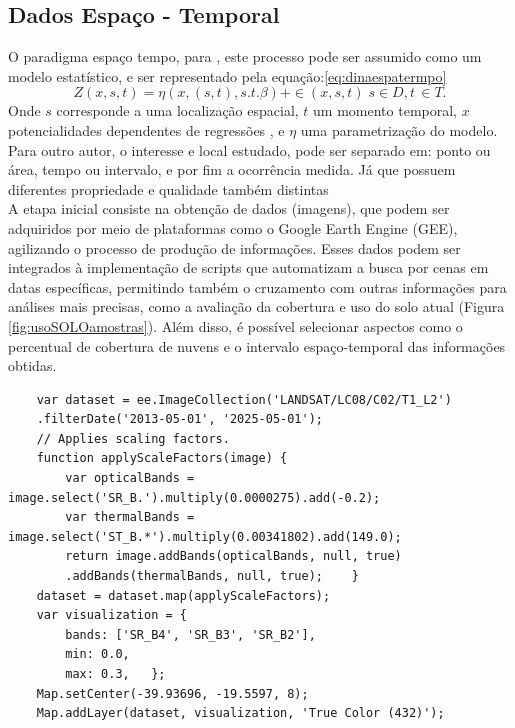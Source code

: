   \subsection{Dados Espaço - Temporal} 
  
  \hspace*{1.25 cm} O paradigma espaço tempo, para \cite[p.2]{mateu}, este processo pode ser assumido como um modelo estatístico, e ser representado pela equação:\eqref{eq:dinaespatermpo}
  \begin{equation}\label{eq:dinaespatermpo}
  	 Z(x,s,t) =  \eta ( x,(s,t), s.t.\beta) + \in (x,s,t)  \; s \in D, t \, \in T.  
  \end{equation}
  \hspace*{1.25 cm}   Onde $s$ corresponde a uma localização espacial, $t$ um momento temporal, $x$ potencialidades  dependentes de regressões , e $ \eta $ uma parametrização do modelo.\\
   \hspace*{1.25 cm} Para outro autor,  \cite[p.151]{Bivand} o interesse e local estudado, pode ser separado em: ponto ou área, tempo ou intervalo, e por fim a ocorrência medida. Já que possuem diferentes  propriedade e qualidade também distintas  \\
  \hspace*{1.25 cm} A etapa inicial consiste na obtenção de dados (imagens), que podem ser adquiridos por meio de plataformas como o Google Earth Engine (GEE), agilizando o processo de produção de informações. Esses dados podem ser integrados à implementação de scripts que automatizam a busca por cenas em datas específicas, permitindo também o cruzamento com outras informações para análises mais precisas, como a avaliação da cobertura e uso do solo atual (Figura \ref{fig:usoSOLOamostras}). Além disso, é possível selecionar aspectos como o percentual de cobertura de nuvens e o intervalo espaço-temporal das informações obtidas.
  \lstset{
  	language=Java, %
  	caption=Código de obtenção de imagens multiespectrais Landsat8 plataforma Google Earth Engine Code\, em linguagem JavaScript.,} %
  
  \begin{lstlisting}
  	var dataset = ee.ImageCollection('LANDSAT/LC08/C02/T1_L2')
  	.filterDate('2013-05-01', '2025-05-01');
  	// Applies scaling factors.
  	function applyScaleFactors(image) {
  		var opticalBands = image.select('SR_B.').multiply(0.0000275).add(-0.2);
  		var thermalBands = image.select('ST_B.*').multiply(0.00341802).add(149.0);
  		return image.addBands(opticalBands, null, true)
  		.addBands(thermalBands, null, true);   	}
  	dataset = dataset.map(applyScaleFactors);
  	var visualization = {
  		bands: ['SR_B4', 'SR_B3', 'SR_B2'],
  		min: 0.0,
  		max: 0.3,  	};
  	Map.setCenter(-39.93696, -19.5597, 8);
  	Map.addLayer(dataset, visualization, 'True Color (432)');
  \end{lstlisting}
